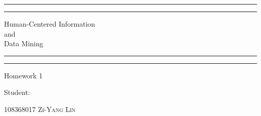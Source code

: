 \begin{titlepage} %

	\centering %
	
	\scshape %
	
	\vspace*{\baselineskip} %
	
	
	\rule{\textwidth}{1.6pt}\vspace*{-\baselineskip}\vspace*{2pt} %
	\rule{\textwidth}{0.4pt} %
	
	\vspace{0.75\baselineskip} %
	
	{\LARGE Human-Centered Information \\ and \\ Data Mining} %
	
	\vspace{0.75\baselineskip} %
	
	\rule{\textwidth}{0.4pt}\vspace*{-\baselineskip}\vspace{3.2pt} %
	\rule{\textwidth}{1.6pt} %
	
	\vspace{2\baselineskip} %
	
	
	Homework 1 %
	
	\vspace*{3\baselineskip} %
	
	
	Student: 
	
	\vspace{0.5\baselineskip} %

	{\scshape 108368017 \hspace{10mm}}
	{\scshape\Large Zi-Yang Lin } %


\end{titlepage}
